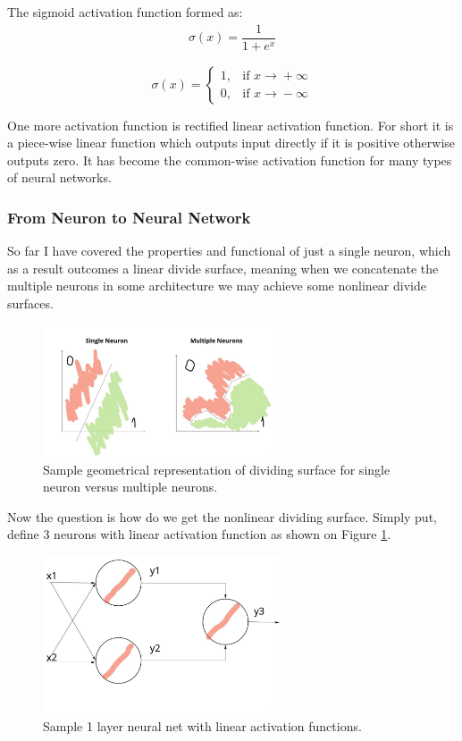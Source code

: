 The sigmoid activation function formed as:
\begin{align*}
\sigma(x) = \dfrac{1}{1+e^x}
\end{align*}

\[ \sigma(x) = \begin{cases} 1, & \mbox{if } x\mbox{$\xrightarrow{} + \infty$} \\ 0, & \mbox{if } x\mbox{$\xrightarrow{} - \infty$} \end{cases} \]

One more activation function is rectified linear activation function. For short it is a piece-wise linear function which outputs input directly if it is positive otherwise outputs zero. It has become the common-wise activation function for many types of neural networks.

\subsubsection{From Neuron to Neural Network}
So far I have covered the properties and functional of just a single neuron, which as a result outcomes a linear divide surface, meaning when we concatenate the multiple neurons in some architecture we may achieve some nonlinear divide surfaces.
\begin{figure}[h]
    \centering \includegraphics[width=7cm]{images/neuron_to_neural_net.jpg}
    \caption {Sample geometrical representation of dividing surface for single neuron versus multiple neurons.}
\end{figure}

Now the question is how do we get the nonlinear dividing surface. Simply put, define 3 neurons with linear activation function as shown on Figure \ref{fig:1_layer_net}. 

\begin{figure}[h]
    \centering \includegraphics[width=7cm]{images/3_neurons_net.jpg}
    \caption {Sample 1 layer neural net with linear activation functions.}
    \label{fig:1_layer_net}
\end{figure}

